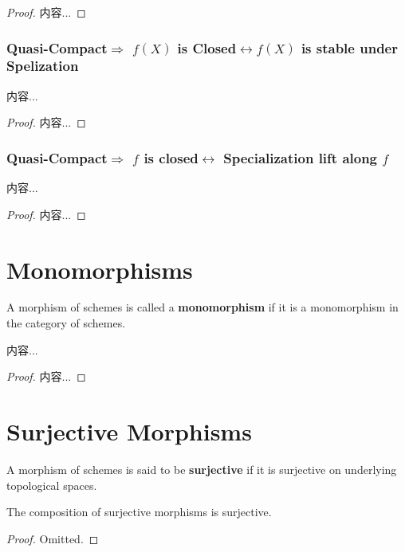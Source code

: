 \documentclass[Total.tex]{subfiles}
\begin{document}
			\begin{lemma}
				
			\end{lemma}
			\begin{proof}
				内容...
			\end{proof}
			\subsubsection{Quasi-Compact$\Rightarrow$ $f(X)$ is Closed$\leftrightarrow f(X)$   is stable under Spelization}
			\begin{lemma}
				内容...
			\end{lemma}
			\begin{proof}
				内容...
			\end{proof}
			\subsubsection{Quasi-Compact$\Rightarrow$ $f$ is closed$\leftrightarrow$ Specialization lift along $f$}
				\begin{lemma}
				内容...
			\end{lemma}
			
			\begin{proof}
				内容...
			\end{proof}
			
		\section{Monomorphisms}
		
			\begin{Def}
				A morphism of schemes is called a \textbf{monomorphism} if it is a monomorphism in the category of schemes.
			\end{Def}
			
			\begin{lemma}
				内容...
			\end{lemma}
			\begin{proof}
				内容...
			\end{proof}
		\section{Surjective Morphisms}
		\begin{Def}
			A morphism of schemes is said to be \textbf{surjective} if it is surjective on underlying topological spaces.
		\end{Def}
		\begin{lemma}
			The composition of surjective morphisms is surjective.
		\end{lemma}
		\begin{proof}
			Omitted.
		\end{proof}
\end{document}
